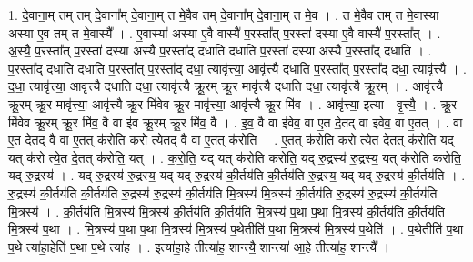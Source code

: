 \documentclass[17pt]{extarticle}
\begin{document}
1. दे॒वाना॒म् तम् तम् दे॒वाना᳚म् दे॒वाना॒म् त मे॒वैव तम् दे॒वाना᳚म् दे॒वाना॒म् त मे॒व । . त मे॒वैव तम् त मे॒वास्या॑ अस्या ए॒व तम् त मे॒वास्यै᳚ । . ए॒वास्या॑ अस्या ए॒वै वास्यै॑ प॒रस्ता᳚त् प॒रस्ता॑ दस्या ए॒वै वास्यै॑ प॒रस्ता᳚त् । . अ॒स्यै॒ प॒रस्ता᳚त् प॒रस्ता॑ दस्या अस्यै प॒रस्ता᳚द् दधाति दधाति प॒रस्ता॑ दस्या अस्यै प॒रस्ता᳚द् दधाति । . प॒रस्ता᳚द् दधाति दधाति प॒रस्ता᳚त् प॒रस्ता᳚द् दधा॒ त्यावृ॑त्त्या॒ आवृ॑त्त्यै दधाति प॒रस्ता᳚त् प॒रस्ता᳚द् दधा॒ त्यावृ॑त्त्यै । . द॒धा॒ त्यावृ॑त्त्या॒ आवृ॑त्त्यै दधाति दधा॒ त्यावृ॑त्त्यै क्रू॒रम् क्रू॒र मावृ॑त्त्यै दधाति दधा॒ त्यावृ॑त्त्यै क्रू॒रम् । . आवृ॑त्त्यै क्रू॒रम् क्रू॒र मावृ॑त्त्या॒ आवृ॑त्त्यै क्रू॒र मि॑वेव क्रू॒र मावृ॑त्त्या॒ आवृ॑त्त्यै क्रू॒र मि॑व । . आवृ॑त्त्या॒ इत्या - वृ॒त्त्यै॒ । . क्रू॒र मि॑वेव क्रू॒रम् क्रू॒र मि॑व॒ वै वा इ॑व क्रू॒रम् क्रू॒र मि॑व॒ वै । . इ॒व॒ वै वा इ॑वेव॒ वा ए॒त दे॒तद् वा इ॑वेव॒ वा ए॒तत् । . वा ए॒त दे॒तद् वै वा ए॒तत् क॑रोति करो त्ये॒तद् वै वा ए॒तत् क॑रोति । . ए॒तत् क॑रोति करो त्ये॒त दे॒तत् क॑रोति॒ यद् यत् क॑रो त्ये॒त दे॒तत् क॑रोति॒ यत् । . क॒रो॒ति॒ यद् यत् क॑रोति करोति॒ यद् रु॒द्रस्य॑ रु॒द्रस्य॒ यत् क॑रोति करोति॒ यद् रु॒द्रस्य॑ । . यद् रु॒द्रस्य॑ रु॒द्रस्य॒ यद् यद् रु॒द्रस्य॑ की॒र्तय॑ति की॒र्तय॑ति रु॒द्रस्य॒ यद् यद् रु॒द्रस्य॑ की॒र्तय॑ति । . रु॒द्रस्य॑ की॒र्तय॑ति की॒र्तय॑ति रु॒द्रस्य॑ रु॒द्रस्य॑ की॒र्तय॑ति मि॒त्रस्य॑ मि॒त्रस्य॑ की॒र्तय॑ति रु॒द्रस्य॑ रु॒द्रस्य॑ की॒र्तय॑ति मि॒त्रस्य॑ । . की॒र्तय॑ति मि॒त्रस्य॑ मि॒त्रस्य॑ की॒र्तय॑ति की॒र्तय॑ति मि॒त्रस्य॑ प॒था प॒था मि॒त्रस्य॑ की॒र्तय॑ति की॒र्तय॑ति मि॒त्रस्य॑ प॒था । . मि॒त्रस्य॑ प॒था प॒था मि॒त्रस्य॑ मि॒त्रस्य॑ प॒थेतीति॑ प॒था मि॒त्रस्य॑ मि॒त्रस्य॑ प॒थेति॑ । . प॒थेतीति॑ प॒था प॒थे त्या॑हा॒हेति॑ प॒था प॒थे त्या॑ह । . इत्या॑हा॒हे तीत्या॑ह॒ शान्त्यै॒ शान्त्या॑ आ॒हे तीत्या॑ह॒ शान्त्यै᳚ । \newline
\end{document}
